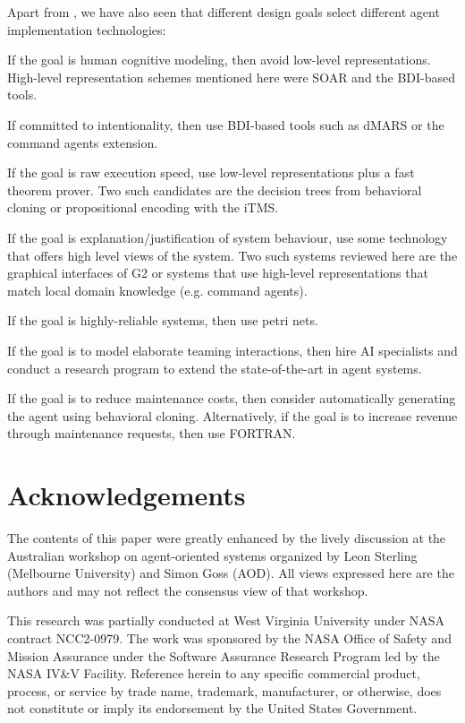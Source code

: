 Apart from , we have also seen that different design
goals select different agent implementation technologies:
 \bi \item If the
goal is human cognitive modeling, then avoid low-level
representations. High-level representation schemes mentioned here
were SOAR and the BDI-based tools.
\item
If committed to intentionality, then use BDI-based tools such as
dMARS or the command agents extension.
\item If the goal is raw execution speed, use low-level representations
plus a fast theorem prover. Two such candidates are the decision
trees from behavioral cloning or  propositional encoding with the
iTMS.
\item
If the goal is explanation/justification of system behaviour, use
some technology that offers high level views of the system. Two
such systems reviewed here are the graphical interfaces of G2 or
systems that use high-level representations that match local
domain knowledge (e.g. command agents).
\item
If the goal is highly-reliable systems, then use petri nets.
\item If the goal is to model elaborate teaming interactions, then
hire AI specialists and conduct a research program to extend the
state-of-the-art in agent systems. \item If the goal is to reduce
maintenance costs, then consider automatically generating the
agent using behavioral cloning. Alternatively, if the goal is to
increase revenue through maintenance requests, then use FORTRAN.
\ei







\section*{Acknowledgements}The contents of this
paper were greatly enhanced by the lively discussion at the
Australian workshop on agent-oriented systems organized by Leon
Sterling (Melbourne University) and Simon Goss (AOD).  All views
expressed here are the authors and may not reflect the consensus
view of that workshop.

This research was partially conducted at West Virginia University
under NASA contract NCC2-0979. The work was sponsored by the NASA
Office of Safety and Mission Assurance under the Software
Assurance Research Program led by the NASA IV\&V Facility.
Reference herein to any specific commercial product, process, or
service by trade name, trademark, manufacturer, or otherwise, does
not constitute or imply its endorsement by the United States
Government.






